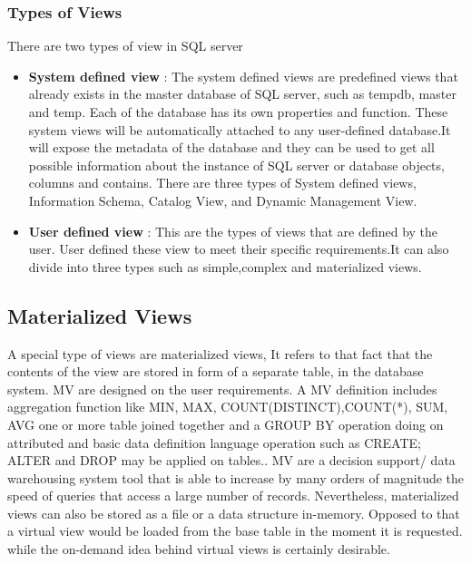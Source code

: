 \subsubsection{Types of Views}
There are two types of view in SQL server
\begin{itemize}
    \item \textbf{System defined view }: The system defined views are predefined views that already exists in the  master database of SQL server, such as tempdb, master and temp. Each of the database has its own properties and function. These system views will be automatically attached to any user-defined database.It will expose the metadata of the database and they can be used to get all possible information about the instance of SQL server or database objects, columns and contains. There are three types of System defined views, Information Schema, Catalog View, and Dynamic Management View. \cite{chauhan-2024}
    \item \textbf{User defined view }: This are the types of views that are defined by the user. User defined these view to meet their specific requirements.It can also divide into three types such as simple,complex and materialized views.\cite{javapoint-author-2024}
\end{itemize}
   
\subsection{Materialized Views }
 A special type of views are materialized views, It refers to that fact that the contents of the view are stored in form of a separate table, in the database system. MV are designed on the user requirements. A MV definition includes aggregation function like MIN, MAX, COUNT(DISTINCT),COUNT(*), SUM, AVG one or more table joined together and a GROUP BY operation doing on attributed and basic data definition language operation such as CREATE; ALTER and DROP may be applied on tables.\cite{Kardel_Thakare}. MV are a decision support/ data warehousing system tool that is able to increase by many orders of magnitude the speed of queries that access a large number of records.\cite{Kishan_Sainath} Nevertheless, materialized views can also be stored as a file or a data structure in-memory. Opposed to that a virtual view would be loaded from the base table in the moment it is requested. while the on-demand idea behind virtual views is certainly desirable.\cite{jan-no-date,ashadevi-2024}\\

